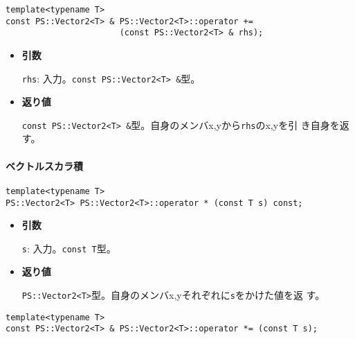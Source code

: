 \begin{screen}
\begin{verbatim}
template<typename T>
const PS::Vector2<T> & PS::Vector2<T>::operator += 
                       (const PS::Vector2<T> & rhs);
\end{verbatim}
\end{screen}

\begin{itemize}

\item{{\bf 引数}}

{\tt rhs}: 入力。{\tt const PS::Vector2<T> \&}型。

\item{{\bf 返り値}}

{\tt const PS::Vector2<T> \&}型。自身のメンバx,yから{\tt rhs}のx,yを引
き自身を返す。

\end{itemize}

\paragraph{ベクトルスカラ積}
\mbox{}

\begin{screen}
\begin{verbatim}
template<typename T>
PS::Vector2<T> PS::Vector2<T>::operator * (const T s) const;
\end{verbatim}
\end{screen}

\begin{itemize}

\item{{\bf 引数}}

{\tt s}: 入力。{\tt const T}型。

\item{{\bf 返り値}}

{\tt PS::Vector2<T>}型。自身のメンバx,yそれぞれに{\tt s}をかけた値を返
す。

\end{itemize}


\begin{screen}
\begin{verbatim}
template<typename T>
const PS::Vector2<T> & PS::Vector2<T>::operator *= (const T s);
\end{verbatim}
\end{screen}

